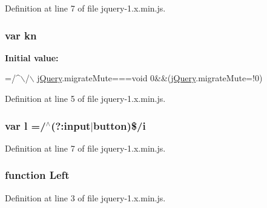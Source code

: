 Definition at line 7 of file jquery-\/1.\+x.\+min.\+js.

\subsubsection[{\texorpdfstring{kn}{kn}}]{\setlength{\rightskip}{0pt plus 5cm}var kn}\hypertarget{jquery-1_8x_8min_8js_a23f32ac4dde4f478204787582eab7830}{}\label{jquery-1_8x_8min_8js_a23f32ac4dde4f478204787582eab7830}
{\bfseries Initial value\+:}
\begin{DoxyCode}
=/^\(\backslash\)/\hyperlink{captcha_8js_a2b1d6f9c448e3ce72f4e1865d6e38d2c}{\(\backslash\)}
\hyperlink{captcha_8js_a2b1d6f9c448e3ce72f4e1865d6e38d2c}{}
\hyperlink{captcha_8js_a2b1d6f9c448e3ce72f4e1865d6e38d2c}{jQuery}.migrateMute===\textcolor{keywordtype}{void} 0&&(\hyperlink{captcha_8js_a2b1d6f9c448e3ce72f4e1865d6e38d2c}{jQuery}.migrateMute=!0)
\end{DoxyCode}


Definition at line 5 of file jquery-\/1.\+x.\+min.\+js.

\subsubsection[{\texorpdfstring{l}{l}}]{\setlength{\rightskip}{0pt plus 5cm}var l =/$^\wedge$(?\+:input$\vert$button)\$/{\bf i}}\hypertarget{jquery-1_8x_8min_8js_ae5e71a2600e8891c54854be157cc6626}{}\label{jquery-1_8x_8min_8js_ae5e71a2600e8891c54854be157cc6626}


Definition at line 7 of file jquery-\/1.\+x.\+min.\+js.

\subsubsection[{\texorpdfstring{Left}{Left}}]{\setlength{\rightskip}{0pt plus 5cm}function Left}\hypertarget{jquery-1_8x_8min_8js_abef68bf244a1159a49fe3a2c153a65d2}{}\label{jquery-1_8x_8min_8js_abef68bf244a1159a49fe3a2c153a65d2}


Definition at line 3 of file jquery-\/1.\+x.\+min.\+js.

